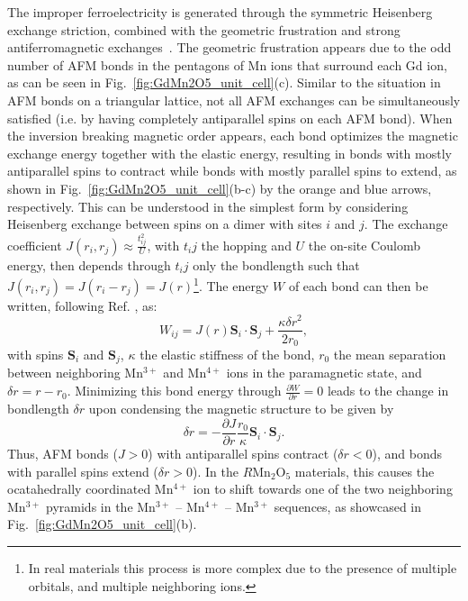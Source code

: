 The improper ferroelectricity is generated through the symmetric Heisenberg exchange striction, combined with the geometric frustration and strong antiferromagnetic exchanges~\cite{Choi2008}.
The geometric frustration appears due to the odd number of AFM bonds in the pentagons of Mn ions that surround each Gd ion, as can be seen in Fig.~\ref{fig:GdMn2O5_unit_cell}(c).
Similar to the situation in AFM bonds on a triangular lattice, not all AFM exchanges can be simultaneously satisfied (i.e. by having completely antiparallel spins on each AFM bond).
When the inversion breaking magnetic order appears, each bond optimizes the magnetic exchange energy together with the elastic energy, resulting in bonds with mostly antiparallel spins to contract while bonds with mostly parallel spins to extend, as shown in Fig.~\ref{fig:GdMn2O5_unit_cell}(b-c) by the orange and blue arrows, respectively.
This can be understood in the simplest form by considering Heisenberg exchange between spins on a dimer with sites $i$ and $j$.
The exchange coefficient $J(r_i, r_j)\approx \frac{t_{ij}^2}{U}$, with $t_ij$ the hopping and $U$ the on-site Coulomb energy, then depends through $t_ij$ only the bondlength such that $J(r_i, r_j) = J(r_i - r_j) = J(r)$\footnote{In real materials this process is more complex due to the presence of multiple orbitals, and multiple neighboring ions.}.
The energy $W$ of each bond can then be written, following Ref. \cite{Harris1972}, as:
\begin{equation}
	W_{ij} = J(r)\bm{S}_i \cdot \bm{S}_j + \frac{\kappa \delta r^2}{2r_0},
\end{equation}
with spins $\bm{S}_i$ and $\bm{S}_j$, $\kappa$ the elastic stiffness of the bond, $r_0$ the mean separation between neighboring Mn$^{3+}$ and Mn$^{4+}$ ions in the paramagnetic state, and $\delta r = r - r_0$.
Minimizing this bond energy through $\frac{\partial W}{\partial r} = 0$ leads to the change in bondlength $\delta r$ upon condensing the magnetic structure to be given by 
\begin{equation}
	\delta r = -\frac{\partial J}{\partial r}\frac{r_0}{\kappa}\bm{S}_i \cdot \bm{S}_j. 
\end{equation}
Thus, AFM bonds ($J > 0$) with antiparallel spins contract ($\delta r < 0$), and bonds with parallel spins extend ($\delta r > 0$).
In the $R$Mn$_2$O$_5$ materials, this causes the ocatahedrally coordinated Mn$^{4+}$ ion to shift towards one of the two neighboring Mn$^{3+}$ pyramids in the Mn$^{3+}$ -- Mn$^{4+}$ -- Mn$^{3+}$ sequences, as showcased in Fig.~\ref{fig:GdMn2O5_unit_cell}(b).
